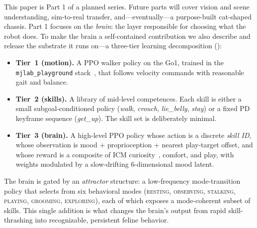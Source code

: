 \documentclass[11pt]{article}
\begin{document}
This paper is Part 1 of a planned series. Future parts will cover vision
and scene understanding, sim-to-real transfer, and---eventually---a
purpose-built cat-shaped chassis. Part 1 focuses on the \emph{brain}: the
layer responsible for choosing what the robot does. To make the brain a
self-contained contribution we also describe and release the substrate it
runs on---a three-tier learning decomposition ():

\begin{itemize}[leftmargin=*,nosep]
  \item \textbf{Tier~1 (motion).} A PPO walker policy on the Go1, trained in
        the \texttt{mjlab\_playground} stack~\cite{mjlab2024}, that follows
        velocity commands with reasonable gait and balance.
  \item \textbf{Tier~2 (skills).} A library of mid-level competences. Each
        skill is either a small subgoal-conditioned policy (\emph{walk},
        \emph{crouch}, \emph{lie\_belly}, \emph{stay}) or a fixed PD keyframe
        sequence (\emph{get\_up}). The skill set is deliberately minimal.
  \item \textbf{Tier~3 (brain).} A high-level PPO policy whose action is a
        discrete \emph{skill ID}, whose observation is mood + proprioception +
        nearest play-target offset, and whose reward is a composite of ICM
        curiosity~\cite{pathak2017curiosity}, comfort, and play, with weights
        modulated by a slow-drifting 6-dimensional mood latent.
\end{itemize}

The brain is gated by an \emph{attractor} structure: a low-frequency
mode-transition policy that selects from six behavioral modes (\textsc{resting},
\textsc{observing}, \textsc{stalking}, \textsc{playing}, \textsc{grooming},
\textsc{exploring}), each of which exposes a mode-coherent subset of skills.
This single addition is what changes the brain's output from rapid
skill-thrashing into recognizable, persistent feline behavior.
\end{document}
